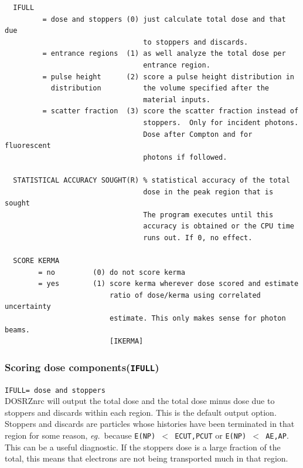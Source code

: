 \documentclass[12pt,twoside]{article}  %
\newcommand{\eg}{{\em eg.}}
\begin{document}
\begin{verbatim}
  IFULL
         = dose and stoppers (0) just calculate total dose and that due
                                 to stoppers and discards.
         = entrance regions  (1) as well analyze the total dose per
                                 entrance region.
         = pulse height      (2) score a pulse height distribution in
           distribution          the volume specified after the
                                 material inputs.
         = scatter fraction  (3) score the scatter fraction instead of
                                 stoppers.  Only for incident photons.
                                 Dose after Compton and for fluorescent
                                 photons if followed.

  STATISTICAL ACCURACY SOUGHT(R) % statistical accuracy of the total
                                 dose in the peak region that is sought
                                 The program executes until this
                                 accuracy is obtained or the CPU time
                                 runs out. If 0, no effect.

  SCORE KERMA
        = no         (0) do not score kerma
        = yes        (1) score kerma wherever dose scored and estimate
                         ratio of dose/kerma using correlated uncertainty
                         estimate. This only makes sense for photon beams.
                         [IKERMA]
\end{verbatim}


\subsubsection{Scoring dose components({\tt IFULL})}

{\tt IFULL= dose and stoppers}\\     DOSRZnrc will output the total dose
and the total dose minus dose due to stoppers and discards within each region.  This is the
default output option.  Stoppers and discards are particles whose histories
have been terminated in that region for some reason, \eg~because {\tt E(NP) $<$ ECUT,PCUT} or
{\tt E(NP) $<$ AE,AP}. This can be a useful diagnostic. If the stoppers
dose is a large fraction of the total, this means that electrons are not
being transported much in that region.
\end{document}
